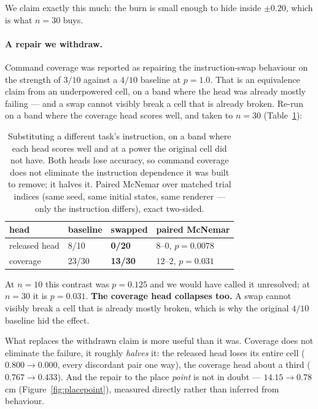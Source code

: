 \documentclass[10pt,twocolumn]{article}
\begin{document}
We claim exactly this much: the burn is small enough to hide inside
$\pm 0.20$, which is what $n{=}30$ buys.

\paragraph{A repair we withdraw.} Command coverage was reported as repairing
the instruction-swap behaviour on the strength of $3/10$ against a $4/10$
baseline at $p = 1.0$. That is an equivalence claim from an underpowered cell,
on a band where the head was already mostly failing --- and a swap cannot
visibly break a cell that is already broken. Re-run on a band where the coverage
head scores well, and taken to $n{=}30$ (Table~\ref{tab:swap}):

\begin{table}[h]\centering\small
\begin{tabular}{llll}
\toprule
head & baseline & swapped & paired McNemar \\
\midrule
released head & 8/10 & \textbf{0/20} & $8$--$0$, $p=0.0078$ \\
coverage & 23/30 & \textbf{13/30} & $12$--$2$, $p=0.031$ \\
\bottomrule
\end{tabular}
\caption{Substituting a different task's instruction, on a band where each head
scores well and at a power the original cell did not have. Both heads lose
accuracy, so command coverage does not eliminate the instruction dependence it
was built to remove; it halves it. Paired McNemar over matched trial indices
(same seed, same initial states, same renderer --- only the instruction
differs), exact two-sided.}
\label{tab:swap}
\end{table}

\noindent At $n{=}10$ this contrast was $p=0.125$ and we would have called it
unresolved; at $n{=}30$ it is $p=0.031$. \textbf{The coverage head collapses
too.} A swap cannot visibly break a cell that is already mostly broken, which is
why the original $4/10$ baseline hid the effect.

What replaces the withdrawn claim is more useful than it was. Coverage does not
eliminate the failure, it roughly \emph{halves} it: the released head loses its
entire cell ($0.800 \to 0.000$, every discordant pair one way), the coverage
head about a third ($0.767 \to 0.433$). And the repair to the place
\emph{point} is not in doubt --- $14.15 \to 0.78$\,cm
(Figure~\ref{fig:placepoint}), measured directly rather than inferred from
behaviour.
\end{document}

